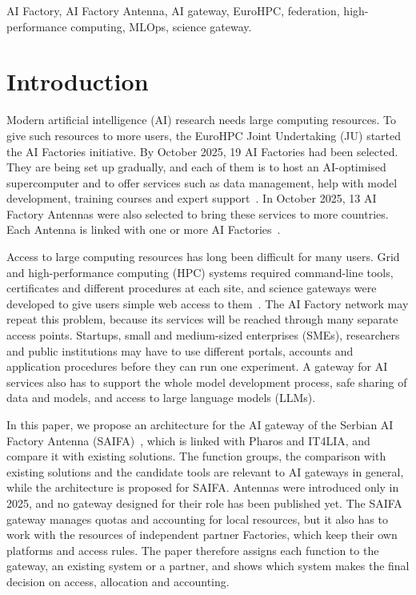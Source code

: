 \documentclass[conference,a4paper]{IEEEtran}
\newif\ifizmene
\DeclareRobustCommand{\roz}[1]{\ifizmene{\color{roze}#1}\else#1\fi}
\DeclareRobustCommand{\nov}[1]{\ifizmene{\color{nova}#1}\else#1\fi}
\DeclareRobustCommand{\tri}[1]{\ifizmene{\color{treca}#1}\else#1\fi}
\begin{document}
\begin{IEEEkeywords}
AI Factory, AI Factory Antenna, AI gateway, EuroHPC, federation, high-performance computing, MLOps, science gateway.
\end{IEEEkeywords}

\section{Introduction}

Modern artificial intelligence (AI) research needs large computing resources. To give such resources to more users, the EuroHPC Joint Undertaking (JU) started the AI Factories initiative. By October 2025, 19 AI Factories had been selected. \nov{They are being set up gradually, and each of them is to host an AI-optimised supercomputer and to offer} \roz{services such as data management, help with model development, training courses} and expert support~\cite{eurohpc_aif,eurohpc_six_aif}. In October 2025, 13 AI Factory Antennas were also selected to bring these services to more countries. Each Antenna is linked with one or more AI Factories~\cite{eurohpc_antennas,eurohpc_antennas_page}.

\nov{Access to large computing resources has long been difficult for many users. Grid and high-performance computing (HPC) systems required command-line tools, certificates and different procedures at each site, and science gateways were developed to give users simple web access to them}~\cite{wilkinsdiehr2007,hudak2018ood}\nov{. The AI Factory network may repeat this problem, because its services will be reached through many separate access points. Startups, small and medium-sized enterprises (SMEs), researchers and public institutions may have to use different portals, accounts and application procedures before they can run one experiment. A gateway for AI services also has to support the whole model development process, safe sharing of data and models, and access to large language models (LLMs).}

\nov{In this paper, we propose an architecture for the AI gateway of the Serbian AI Factory Antenna (SAIFA)~\cite{cordis_saifa,saifa_d31}, which is linked with Pharos and IT4LIA, and compare it with existing solutions. The function groups, the comparison with existing solutions and the candidate tools are relevant to AI gateways in general, while the architecture is proposed for SAIFA. Antennas were introduced only in 2025, and \tri{no gateway designed for their role has been published yet}. The SAIFA gateway manages quotas and accounting for local resources, but it also has to work with the resources of independent partner Factories, which keep their own platforms and access rules. \tri{The paper therefore assigns each function to the gateway, an existing system or a partner, and shows which system makes the final decision on access, allocation and accounting.}}
\end{document}
